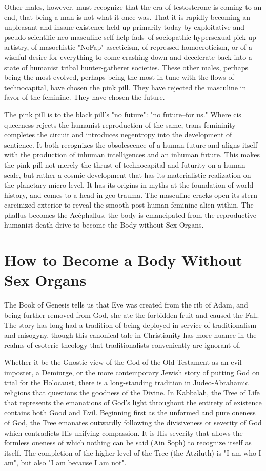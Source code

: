 \documentclass[12pt, a5paper, twoside, openright]{memoir}
\begin{document}
Other males, however, must recognize that the era of testosterone is coming to an end, that being a man is not what it once was. That it is rapidly becoming an unpleasant and insane existence held up primarily today by exploitative and pseudo-scientific neo-masculine self-help fads--of sociopathic hypersexual pick-up artistry, of masochistic "NoFap" asceticism, of repressed homoeroticism, or of a wishful desire for everything to come crashing down and decelerate back into a state of humanist tribal hunter-gatherer societies. These other males, perhaps being the most evolved, perhaps being the most in-tune with the flows of technocapital, have chosen the pink pill. They have rejected the masculine in favor of the feminine. They have chosen the future.

The pink pill is to the black pill's "no future": "no future--for us." Where cis queerness rejects the humanist reproduction of the same, trans femininity completes the circuit and introduces negentropy into the development of sentience. It both recognizes the obsolescence of a human future and aligns itself with the production of inhuman intelligences and an inhuman future. This makes the pink pill not merely the thrust of technocapital and futurity on a human scale, but rather a cosmic development that has its materialistic realization on the planetary micro level. It has its origins in myths at the foundation of world history, and comes to a head in geo-trauma. The masculine cracks open its stern carcinized exterior to reveal the smooth post-human feminine alien within. The phallus becomes the Acéphallus, the body is emancipated from the reproductive humanist death drive to become the Body without Sex Organs.

\chapter{How to Become a Body Without Sex Organs}

The Book of Genesis tells us that Eve was created from the rib of Adam, and being further removed from God, she ate the forbidden fruit and caused the Fall. The story has long had a tradition of being deployed in service of traditionalism and misogyny, though this canonical tale in Christianity has more nuance in the realms of esoteric theology that traditionalists conveniently are ignorant of.

Whether it be the Gnostic view of the God of the Old Testament as an evil imposter, a Demiurge, or the more contemporary Jewish story of putting God on trial for the Holocaust, there is a long-standing tradition in Judeo-Abrahamic religions that questions the goodness of the Divine. In Kabbalah, the Tree of Life that represents the emanations of God's light throughout the entirety of existence contains both Good and Evil. Beginning first as the unformed and pure oneness of God, the Tree emanates outwardly following the divisiveness or severity of God which contradicts His unifying compassion. It is His severity that allows the formless oneness of which nothing can be said (Ain Soph) to recognize itself as itself. The completion of the higher level of the Tree (the Atziluth) is "I am who I am", but also "I am because I am not".
\end{document}
